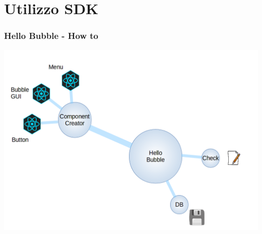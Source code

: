 \section{Utilizzo SDK}
\begin{frame}
  \frametitle{Hello Bubble - How to}
  \begin{center}
    \includegraphics[scale=0.30]{code/bubbleMap.png}
  \end{center}
\end{frame}

